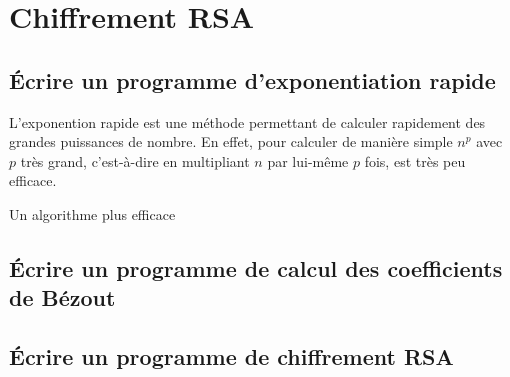 \chapter{Chiffrement RSA}

\section{Écrire un programme d'exponentiation rapide}

L'exponention rapide est une méthode permettant de calculer rapidement des grandes puissances de nombre. En effet, pour calculer de manière simple $n^p$ avec $p$ très grand, c'est-à-dire en multipliant $n$ par lui-même $p$ fois, est très peu efficace.

Un algorithme plus efficace 


\section{Écrire un programme de calcul des coefficients de Bézout}

\section{Écrire un programme de chiffrement RSA}